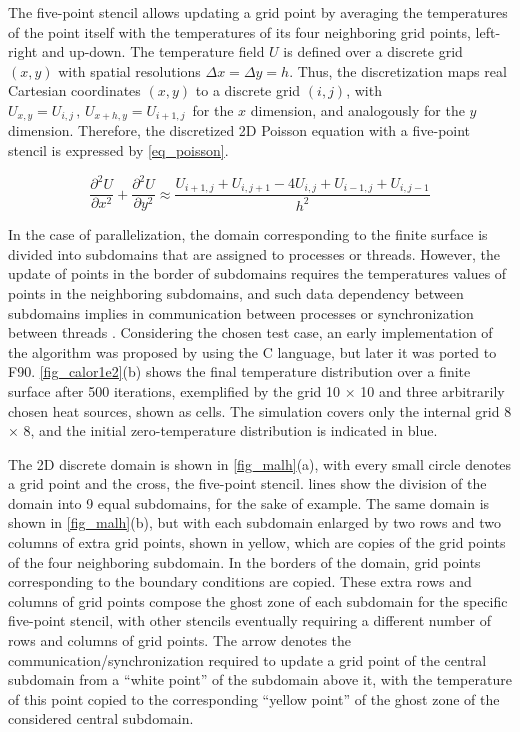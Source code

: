 The five-point stencil allows updating a grid point by averaging the temperatures of the point itself with the temperatures of its four neighboring grid points, left-right and up-down. The temperature field $U$ is defined over a discrete grid $(x,y)$ with spatial resolutions  $\Delta x = \Delta y = h$. Thus, the discretization maps real Cartesian coordinates $(x,y)$ to a discrete grid $(i,j)$, with $U_{x,y}=U_{i,j} \, , \,  U_{x+h,y}=U_{i+1,j} \,$ for the $x$ dimension, and analogously for the $y$ dimension. Therefore, the discretized 2D Poisson equation with a five-point stencil is expressed by \autoref {eq_poisson}.

\begin{equation}
  \frac{\partial^2 U}{\partial x^2} +
  \frac{\partial^2 U}{\partial y^2} \approx
  \frac{U_{i+1,j}+U_{i,j+1}-4U_{i,j}+U_{i-1,j}+U_{i,j-1}}{h^2}
  \label{eq_poisson}
\end{equation}

In the case of parallelization, the domain corresponding to the finite surface is divided into subdomains that are assigned to processes or threads. However, the update of points in the border of subdomains requires the temperatures values of points in the neighboring subdomains, and such data dependency between subdomains implies in communication between processes or synchronization between threads \cite {Langtangen2008a}. Considering the chosen test case, an early implementation of the algorithm was proposed by  using the C language, but later it was ported to F90. \autoref {fig_calor1e2}(b) shows the final temperature distribution over a finite surface after 500 iterations, exemplified by the grid 10 × 10 and three arbitrarily chosen heat sources, shown as  cells. The simulation covers only the internal grid 8 × 8, and the initial zero-temperature distribution is indicated in blue.

The 2D discrete domain is shown in \autoref {fig_malh}(a), with every small circle denotes a grid point and the  cross, the five-point stencil.  lines show the division of the domain into 9 equal subdomains, for the sake of example. The same domain is shown in \autoref {fig_malh}(b), but with each subdomain enlarged by two rows and two columns of extra grid points, shown in yellow, which are copies of the grid points of the four neighboring subdomain. In the borders of the domain, grid points corresponding to the boundary conditions are copied. These extra rows and columns of grid points compose the ghost zone of each subdomain for the specific five-point stencil, with other stencils eventually requiring a different number of rows and columns of grid points. The  arrow denotes the communication/synchronization required to update a grid point of the central subdomain from a ``white point'' of the subdomain above it, with the temperature of this point copied to the corresponding ``yellow point'' of the ghost zone of the considered central subdomain.

